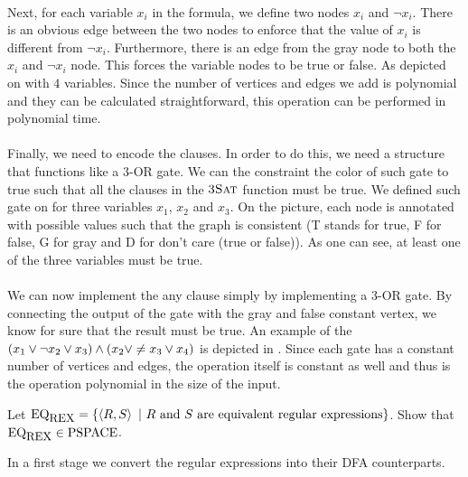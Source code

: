 \documentclass{article}
\begin{document}
\begin{exercise}
\begin{answer}
\paragraph{}
Next, for each variable $x_i$ in the  formula, we define two nodes $x_i$ and $\neg x_i$. There is an obvious edge between the two nodes to enforce that the value of $x_i$ is different from $\neg x_i$. Furthermore, there is an edge from the gray node to both the $x_i$ and $\neg x_i$ node. This forces the variable nodes to be true or false. As depicted on  with $4$ variables. Since the number of vertices and edges we add is polynomial and they can be calculated straightforward, this operation can be performed in polynomial time.
\paragraph{}
Finally, we need to encode the clauses. In order to do this, we need a structure that functions like a 3-OR gate. We can the constraint the color of such gate to true such that all the clauses in the $\mbox{\textsc{3Sat}}$ function must be true. We defined such gate on  for three variables $x_1$, $x_2$ and $x_3$. On the picture, each node is annotated with possible values such that the graph is consistent (T stands for true, F for false, G for gray and D for don't care (true or false)). As one can see, at least one of the three variables must be true.
\paragraph{}
We can now implement the any clause simply by implementing a 3-OR gate. By connecting the output of the gate with the gray and false constant vertex, we know for sure that the result must be true. An example of the $\left( x_1\vee\neg x_2\vee x_3 \right)\wedge\left( x_2\vee\ne x_3\vee x_4 \right)$ is depicted in . Since each gate has a constant number of vertices and edges, the operation itself is constant as well and thus is the operation polynomial in the size of the input.
\end{answer}
\end{exercise}
\begin{exercise}
Let $\mbox{EQ}_{\mbox{\small{REX}}}=\left\{ \left\langle R,S \right\rangle\ |\ \mbox{$R$ and $S$ are equivalent regular expressions} \right\}$. Show that $\mbox{EQ}_{\mbox{\small{REX}}}\in\mbox{PSPACE}$.
\begin{answer}
In a first stage we convert the regular expressions into their DFA counterparts. 
\end{answer}
\end{exercise}
\end{document}
